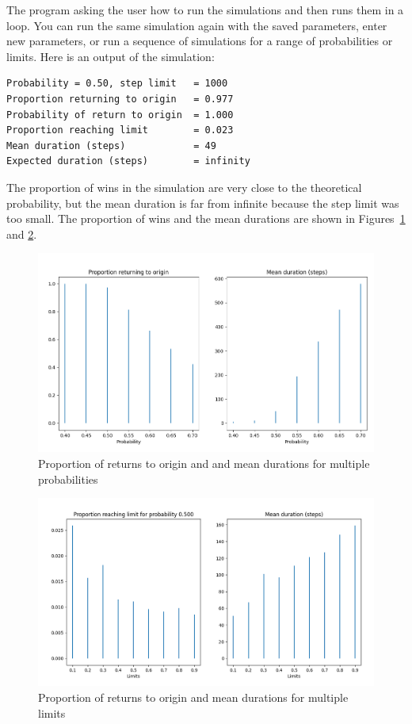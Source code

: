 The program asking the user how to run the simulations and then runs them in a loop. You can run the same simulation again with the saved parameters, enter new parameters, or run a sequence of simulations for a range of probabilities or limits. Here is an output of the simulation:
\begin{verbatim}
Probability = 0.50, step limit   = 1000
Proportion returning to origin   = 0.977
Probability of return to origin  = 1.000
Proportion reaching limit        = 0.023
Mean duration (steps)            = 49
Expected duration (steps)        = infinity
\end{verbatim}
The proportion of wins in the simulation are very close to the theoretical probability, but the mean duration is far from infinite because the step limit was too small.  The proportion of wins and the mean durations are shown in Figures~\ref{f.random-walk-01} and \ref{f.random-walk-02}.
\begin{figure}
\begin{center}
\includegraphics[width=\textwidth]{random-walk-01}
\caption{Proportion of returns to origin and and mean durations for multiple probabilities}\label{f.random-walk-01}
\end{center}
\end{figure}
\begin{figure}
\begin{center}
\includegraphics[width=\textwidth]{random-walk-02}
\caption{Proportion of returns to origin and mean durations for multiple limits}\label{f.random-walk-02}
\end{center}
\end{figure}

